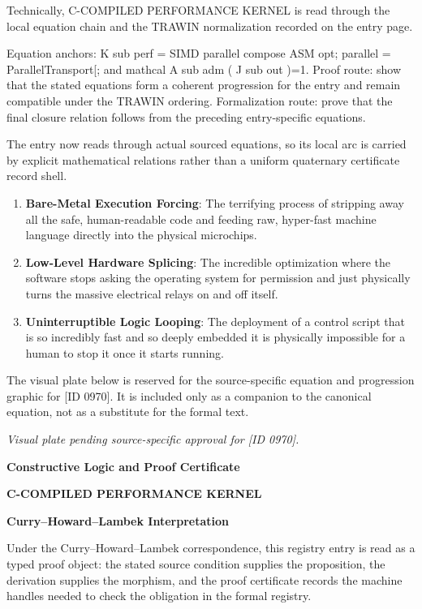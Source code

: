 Technically, C-COMPILED PERFORMANCE KERNEL is read through the local equation chain and the TRAWIN normalization recorded on the entry page.

Equation anchors: K sub perf = SIMD parallel compose ASM opt; parallel = ParallelTransport[; and mathcal A sub adm ( J sub out )=1. Proof route: show that the stated equations form a coherent progression for the entry and remain compatible under the TRAWIN ordering. Formalization route: prove that the final closure relation follows from the preceding entry-specific equations.

The entry now reads through actual sourced equations, so its local arc is carried by explicit mathematical relations rather than a uniform quaternary certificate record shell.
\endgroup

\begin{enumerate}[leftmargin=1.6em,itemsep=6pt,topsep=4pt]
\item \textbf{Bare-Metal Execution Forcing}: The terrifying process of stripping away all the safe, human-readable code and feeding raw, hyper-fast machine language directly into the physical microchips.
\item \textbf{Low-Level Hardware Splicing}: The incredible optimization where the software stops asking the operating system for permission and just physically turns the massive electrical relays on and off itself.
\item \textbf{Uninterruptible Logic Looping}: The deployment of a control script that is so incredibly fast and so deeply embedded it is physically impossible for a human to stop it once it starts running.
\end{enumerate}

\begingroup\footnotesize\sloppy
The visual plate below is reserved for the source-specific equation and progression graphic for [ID 0970]. It is included only as a companion to the canonical equation, not as a substitute for the formal text.
\par\endgroup
\begingroup\footnotesize\itshape
Visual plate pending source-specific approval for [ID 0970].
\par\endgroup

\clearpage
\begingroup\tzpsupportsetup
\noindent\textbf{\fontsize{10.8pt}{12.8pt}\selectfont [ID 0970] Constructive Logic and Proof Certificate}\par
\noindent\textbf{\fontsize{10pt}{12pt}\selectfont C-COMPILED PERFORMANCE KERNEL}\par
\vspace{0.45em}
\begingroup
\footnotesize
\setlength{\parskip}{0.22em}
\setlength{\parindent}{0pt}
\noindent\textbf{Curry--Howard--Lambek Interpretation}\par
Under the Curry--Howard--Lambek correspondence, this registry entry is read as a typed proof
object: the stated source condition supplies the proposition, the derivation supplies the
morphism, and the proof certificate records the machine handles needed to check the obligation
in the formal registry.

